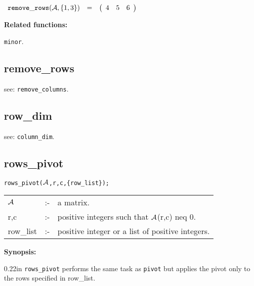 \vspace*{0.1in}

\begin{flushleft}
\hspace*{0.1in}
\begin{math}
\begin{array}{ccc}
{\tt remove\_rows}({\cal A},\{1,3\}) & = &
        \left( \begin{array}{ccc} 4 & 5 & 6
 \end{array} \right)
\end{array}
\end{math}
\end{flushleft}


{\bf Related functions:}

\hspace*{0.175in} {\tt minor}.


\subsection{remove\_rows}

\hspace*{0.175in} see: {\tt remove\_columns}.


\subsection{row\_dim}

\hspace{0.175in} see: {\tt column\_dim}.


\subsection{rows\_pivot}


\hspace*{0.175in} {\tt rows\_pivot(${\cal A}$,r,c,\{row\_list\});}

\hspace*{0.1in}
\begin{tabular}{l l l}
${\cal A}$ &:-& a matrix. \\
r,c        &:-& positive integers such that ${\cal A}$(r,c) neq 0.\\
row\_list  &:-& positive integer or a list of positive integers.
\end{tabular}

{\bf Synopsis:} %

\begin{addtolength}{\leftskip}{0.22in}
{\tt rows\_pivot} performs the same task as {\tt pivot} but applies
the pivot only to the rows specified in row\_list.

\end{addtolength}

